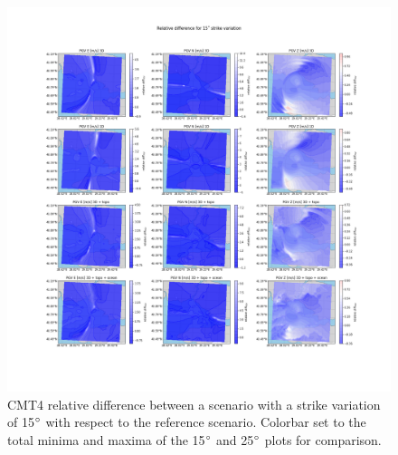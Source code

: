 \documentclass[../Text/00main.tex]{subfiles}
\begin{document}
\begin{figure}[!h]
    \centering
    \includegraphics[width=1.2\linewidth]{images_results/strike_variation_epsilon12_sc4.png}
    \caption{CMT4 relative difference between a scenario with a strike variation of 15$\degree$ with respect to the reference scenario. Colorbar set to the total minima and maxima of the 15$\degree$ and 25$\degree$ plots for comparison.}
    \label{fig:ref_eps12-2}
\end{figure}
\end{document}
